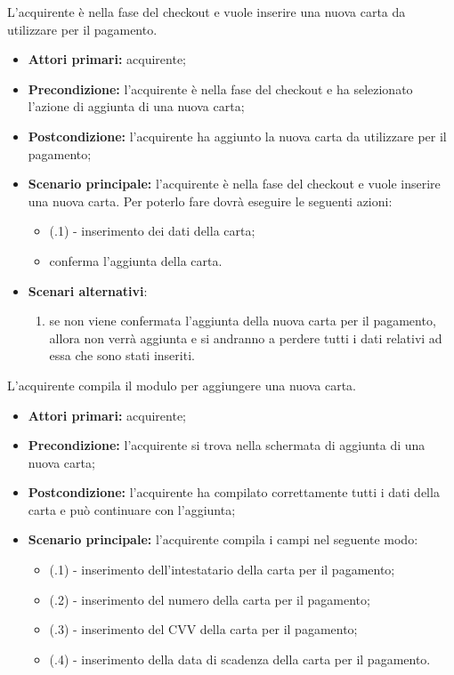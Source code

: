 
L'acquirente è nella fase del checkout e vuole inserire una nuova carta da utilizzare per il pagamento.
\begin{itemize}
    \item \textbf{Attori primari:} acquirente;
    \item \textbf{Precondizione:} l'acquirente è nella fase del checkout e ha selezionato l'azione di aggiunta di una nuova carta;
    \item \textbf{Postcondizione:} l'acquirente ha aggiunto la nuova carta da utilizzare per il pagamento;
    \item \textbf{Scenario principale:} l'acquirente è nella fase del checkout e vuole inserire una nuova carta. Per poterlo fare dovrà eseguire le seguenti azioni:
    \begin{itemize}
        \item (\actualUC.1) - inserimento dei dati della carta;
        \item conferma l'aggiunta della carta.
    \end{itemize}
    \item \textbf{Scenari alternativi}:
    \begin{enumerate}[label=\lett]
        \item se non viene confermata l'aggiunta della nuova carta per il pagamento, allora non verrà aggiunta e si andranno a perdere tutti i dati relativi ad essa che sono stati inseriti.
    \end{enumerate}
\end{itemize}

\resetSubUC

L'acquirente compila il modulo per aggiungere una nuova carta.
\begin{itemize}
	\item \textbf{Attori primari:} acquirente;
	\item \textbf{Precondizione:} l'acquirente si trova nella schermata di aggiunta di una nuova carta;
	\item \textbf{Postcondizione:} l'acquirente ha compilato correttamente tutti i dati della carta e può continuare con l'aggiunta;
	\item \textbf{Scenario principale:} l'acquirente compila i campi nel seguente modo:
	\begin{itemize}
		\item (\actualSubUC.1) - inserimento dell'intestatario della carta per il pagamento;
		\item (\actualSubUC.2) - inserimento del numero della carta per il pagamento;
		\item (\actualSubUC.3) - inserimento del CVV della carta per il pagamento;
		\item (\actualSubUC.4) - inserimento della data di scadenza della carta per il pagamento.
	\end{itemize}
\end{itemize}


